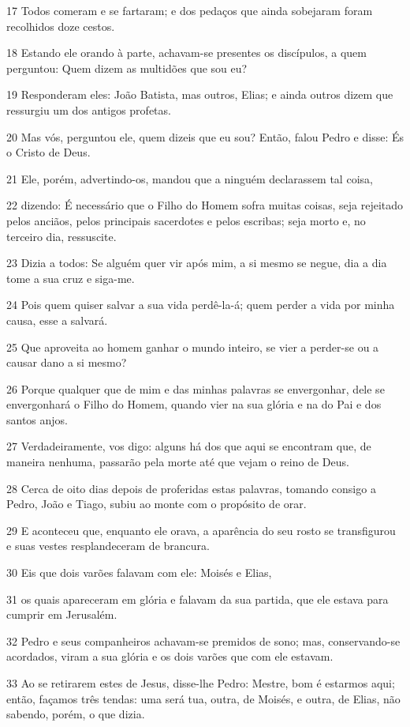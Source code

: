 \par 17 Todos comeram e se fartaram; e dos pedaços que ainda sobejaram foram recolhidos doze cestos.
\par 18 Estando ele orando à parte, achavam-se presentes os discípulos, a quem perguntou: Quem dizem as multidões que sou eu?
\par 19 Responderam eles: João Batista, mas outros, Elias; e ainda outros dizem que ressurgiu um dos antigos profetas.
\par 20 Mas vós, perguntou ele, quem dizeis que eu sou? Então, falou Pedro e disse: És o Cristo de Deus.
\par 21 Ele, porém, advertindo-os, mandou que a ninguém declarassem tal coisa,
\par 22 dizendo: É necessário que o Filho do Homem sofra muitas coisas, seja rejeitado pelos anciãos, pelos principais sacerdotes e pelos escribas; seja morto e, no terceiro dia, ressuscite.
\par 23 Dizia a todos: Se alguém quer vir após mim, a si mesmo se negue, dia a dia tome a sua cruz e siga-me.
\par 24 Pois quem quiser salvar a sua vida perdê-la-á; quem perder a vida por minha causa, esse a salvará.
\par 25 Que aproveita ao homem ganhar o mundo inteiro, se vier a perder-se ou a causar dano a si mesmo?
\par 26 Porque qualquer que de mim e das minhas palavras se envergonhar, dele se envergonhará o Filho do Homem, quando vier na sua glória e na do Pai e dos santos anjos.
\par 27 Verdadeiramente, vos digo: alguns há dos que aqui se encontram que, de maneira nenhuma, passarão pela morte até que vejam o reino de Deus.
\par 28 Cerca de oito dias depois de proferidas estas palavras, tomando consigo a Pedro, João e Tiago, subiu ao monte com o propósito de orar.
\par 29 E aconteceu que, enquanto ele orava, a aparência do seu rosto se transfigurou e suas vestes resplandeceram de brancura.
\par 30 Eis que dois varões falavam com ele: Moisés e Elias,
\par 31 os quais apareceram em glória e falavam da sua partida, que ele estava para cumprir em Jerusalém.
\par 32 Pedro e seus companheiros achavam-se premidos de sono; mas, conservando-se acordados, viram a sua glória e os dois varões que com ele estavam.
\par 33 Ao se retirarem estes de Jesus, disse-lhe Pedro: Mestre, bom é estarmos aqui; então, façamos três tendas: uma será tua, outra, de Moisés, e outra, de Elias, não sabendo, porém, o que dizia.
